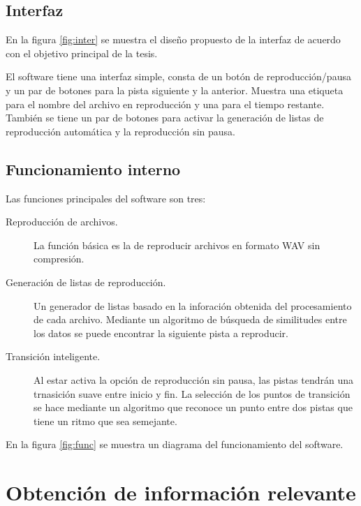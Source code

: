 \subsection{Interfaz}

En la figura \ref{fig:inter} se muestra el dise\~no propuesto de la interfaz de acuerdo con el objetivo principal de la tesis. 



\noindent El software tiene una interfaz simple, consta de un bot\'on de reproducci\'on/pausa y un par de botones para la pista siguiente y la anterior. Muestra una etiqueta para el nombre del archivo en reproducci\'on y una para el tiempo restante. Tambi\'en se tiene un par de botones para activar la generaci\'on de listas de reproducci\'on autom\'atica y la reproducci\'on sin pausa.


\subsection{Funcionamiento interno}

Las funciones principales del software son tres:

\begin{description}
\item[Reproducci\'on de archivos.]{La funci\'on b\'asica es la de reproducir archivos en formato {\sc WAV} sin compresi\'on.}
\item[Generaci\'on de listas de reproducci\'on.]{Un generador de listas basado en la inforaci\'on obtenida del procesamiento de cada archivo. Mediante un algoritmo de b\'usqueda de similitudes entre los datos se puede encontrar la siguiente pista a reproducir.}
\item[Transici\'on inteligente.]{Al estar activa la opci\'on de reproducci\'on sin pausa, las pistas tendr\'an una trnasici\'on suave entre inicio y fin. La selecci\'on de los puntos de transici\'on se hace mediante un algoritmo que reconoce un punto entre dos pistas que tiene un ritmo que sea semejante.}
\end{description}

\noindent En la figura \ref{fig:func} se muestra un diagrama del funcionamiento del software.



\section{Obtenci\'on de informaci\'on relevante}

